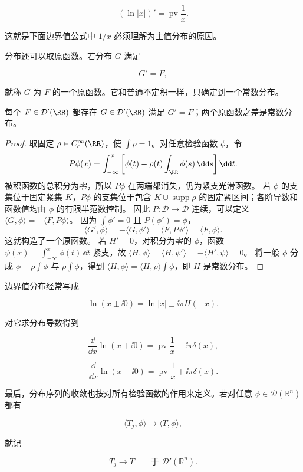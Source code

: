 \[
\boxed{(\ln|x|)'=\operatorname{pv}\frac1x}.
\]

这就是下面边界值公式中 $1/x$ 必须理解为主值分布的原因。

分布还可以取原函数。若分布 $G$ 满足

\[
G'=F,
\]

就称 $G$ 为 $F$ 的一个原函数。它和普通不定积一样，只确定到一个常数分布。

\begin{proposition}[实线上分布原函数的存在与唯一性]
每个 $F\in\mathcal D'(\RR)$ 都存在 $G\in\mathcal D'(\RR)$ 满足 $G'=F$；两个原函数之差是常数分布。
\end{proposition}
\begin{proof}
取固定 $\rho\in C_c^\infty(\RR)$，使 $\int\rho=1$。对任意检验函数 $\phi$，令
\[
P\phi(x)=\int_{-\infty}^x\left[\phi(t)-\rho(t)\int_{\RR}\phi(s)\,\dd s\right]\dd t.
\]
被积函数的总积分为零，所以 $P\phi$ 在两端都消失，仍为紧支光滑函数。
若 $\phi$ 的支集位于固定紧集 $K$，$P\phi$ 的支集位于包含 $K\cup\operatorname{supp}\rho$ 的固定紧区间；各阶导数和函数值均由 $\phi$ 的有限半范数控制。
因此 $P:\mathcal D\to\mathcal D$ 连续，可以定义 $\langle G,\phi\rangle=-\langle F,P\phi\rangle$。
因为 $\int\phi'=0$ 且 $P(\phi')=\phi$，
\[
\langle G',\phi\rangle=-\langle G,\phi'\rangle
=\langle F,P\phi'\rangle=\langle F,\phi\rangle.
\]
这就构造了一个原函数。
若 $H'=0$，对积分为零的 $\phi$，函数 $\psi(x)=\int_{-\infty}^x\phi(t)\,\dd t$ 紧支，故
$\langle H,\phi\rangle=\langle H,\psi'\rangle=-\langle H',\psi\rangle=0$。
将一般 $\phi$ 分成 $\phi-\rho\int\phi$ 与 $\rho\int\phi$，得到
$\langle H,\phi\rangle=\langle H,\rho\rangle\int\phi$，即 $H$ 是常数分布。
\end{proof}

边界值分布经常写成

\[
\ln(x\pm \ii 0)
=\ln|x|\pm \ii\pi H(-x).
\]

对它求分布导数得到

\[
\boxed{
\frac{\dd}{\dd x}\ln(x+\ii 0)
=\operatorname{pv}\frac1x-\ii\pi\delta(x)
},
\]

\[
\boxed{
\frac{\dd}{\dd x}\ln(x-\ii 0)
=\operatorname{pv}\frac1x+\ii\pi\delta(x)
}.
\]

最后，分布序列的收敛也按对所有检验函数的作用来定义。若对任意 $\phi\in\mathcal D(\mathbb R^n)$ 都有

\[
\langle T_j,\phi\rangle\to\langle T,\phi\rangle,
\]

就记

\[
T_j\to T\qquad\text{于 }\mathcal D'(\mathbb R^n).
\]

